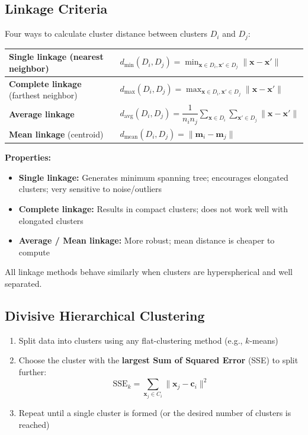 \documentclass[11pt,a4paper]{article}
\theoremstyle{definition}
\theoremstyle{plain}
\theoremstyle{remark}
\begin{document}
\subsection{Linkage Criteria}

Four ways to calculate cluster distance between clusters $D_i$ and $D_j$:

\begin{center}
\renewcommand{\arraystretch}{1.6}
\begin{tabular}{|l|l|}
\hline
\textbf{Single linkage} (nearest neighbor) & $d_{\min}(D_i, D_j) = \displaystyle\min_{\mathbf{x} \in D_i, \mathbf{x}' \in D_j} \|\mathbf{x} - \mathbf{x}'\|$ \\
\hline
\textbf{Complete linkage} (farthest neighbor) & $d_{\max}(D_i, D_j) = \displaystyle\max_{\mathbf{x} \in D_i, \mathbf{x}' \in D_j} \|\mathbf{x} - \mathbf{x}'\|$ \\
\hline
\textbf{Average linkage} & $d_{\text{avg}}(D_i, D_j) = \dfrac{1}{n_i n_j} \displaystyle\sum_{\mathbf{x} \in D_i} \sum_{\mathbf{x}' \in D_j} \|\mathbf{x} - \mathbf{x}'\|$ \\
\hline
\textbf{Mean linkage} (centroid) & $d_{\text{mean}}(D_i, D_j) = \|\mathbf{m}_i - \mathbf{m}_j\|$ \\
\hline
\end{tabular}
\end{center}

\textbf{Properties:}
\begin{itemize}
    \item \textbf{Single linkage:} Generates minimum spanning tree; encourages elongated clusters; very sensitive to noise/outliers
    \item \textbf{Complete linkage:} Results in compact clusters; does not work well with elongated clusters
    \item \textbf{Average / Mean linkage:} More robust; mean distance is cheaper to compute
\end{itemize}

All linkage methods behave similarly when clusters are hyperspherical and well separated.

\subsection{Divisive Hierarchical Clustering}

\begin{enumerate}
    \item Split data into clusters using any flat-clustering method (e.g., $k$-means)
    \item Choose the cluster with the \textbf{largest Sum of Squared Error} (SSE) to split further:
    \[
    \text{SSE}_k = \sum_{\mathbf{x}_j \in C_i} \|\mathbf{x}_j - \mathbf{c}_i\|^2
    \]
    \item Repeat until a single cluster is formed (or the desired number of clusters is reached)
\end{enumerate}
\end{document}
